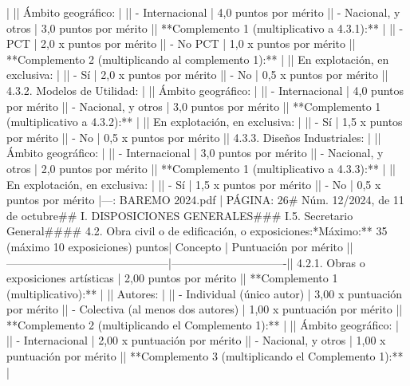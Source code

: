 \documentclass{article}
\begin{document}
\begin{itemize}
{{{{{{ |                               |\n| Ámbito geográfico:                         |                               |\n| - Internacional                            | 4,0 puntos por mérito         |\n| - Nacional, y otros                        | 3,0 puntos por mérito         |\n| **Complemento 1 (multiplicativo a 4.3.1):** |                             |\n| - PCT                                      | 2,0 x puntos por mérito       |\n| - No PCT                                   | 1,0 x puntos por mérito       |\n| **Complemento 2 (multiplicando al complemento 1):** |                       |\n| En explotación, en exclusiva:              |                               |\n| - Sí                                       | 2,0 x puntos por mérito       |\n| - No                                       | 0,5 x puntos por mérito       |\n| 4.3.2. Modelos de Utilidad:                |                               |\n| Ámbito geográfico:                         |                               |\n| - Internacional                            | 4,0 puntos por mérito         |\n| - Nacional, y otros                        | 3,0 puntos por mérito         |\n| **Complemento 1 (multiplicativo a 4.3.2):** |                             |\n| En explotación, en exclusiva:              |                               |\n| - Sí                                       | 1,5 x puntos por mérito       |\n| - No                                       | 0,5 x puntos por mérito       |\n| 4.3.3. Diseños Industriales:               |                               |\n| Ámbito geográfico:                         |                               |\n| - Internacional                            | 3,0 puntos por mérito         |\n| - Nacional, y otros                        | 2,0 puntos por mérito         |\n| **Complemento 1 (multiplicativo a 4.3.3):** |                             |\n| En explotación, en exclusiva:              |                               |\n| - Sí                                       | 1,5 x puntos por mérito       |\n| - No                                       | 0,5 x puntos por mérito       |\n\n---\n\nFUENTE: BAREMO 2024.pdf | PÁGINA: 26\n# Núm. 12/2024, de 11 de octubre\n\n## I. DISPOSICIONES GENERALES\n\n### I.5. Secretario General\n\n#### 4.2. Obra civil o de edificación, o exposiciones:\n**Máximo:** 35 (máximo 10 exposiciones) puntos\n\n| Concepto                                   | Puntuación por mérito         |\n|--------------------------------------------|-------------------------------|\n| 4.2.1. Obras o exposiciones artísticas     | 2,00 puntos por mérito        |\n| **Complemento 1 (multiplicativo):**       |                               |\n| Autores:                                   |                               |\n| - Individual (único autor)                 | 3,00 x puntuación por mérito  |\n| - Colectiva (al menos dos autores)         | 1,00 x puntuación por mérito  |\n| **Complemento 2 (multiplicando el Complemento 1):** |                       |\n| Ámbito geográfico:                         |                               |\n| - Internacional                            | 2,00 x puntuación por mérito  |\n| - Nacional, y otros                        | 1,00 x puntuación por mérito  |\n| **Complemento 3 (multiplicando el Complemento 1):** |            }}}}}}
\end{itemize}
\end{document}
